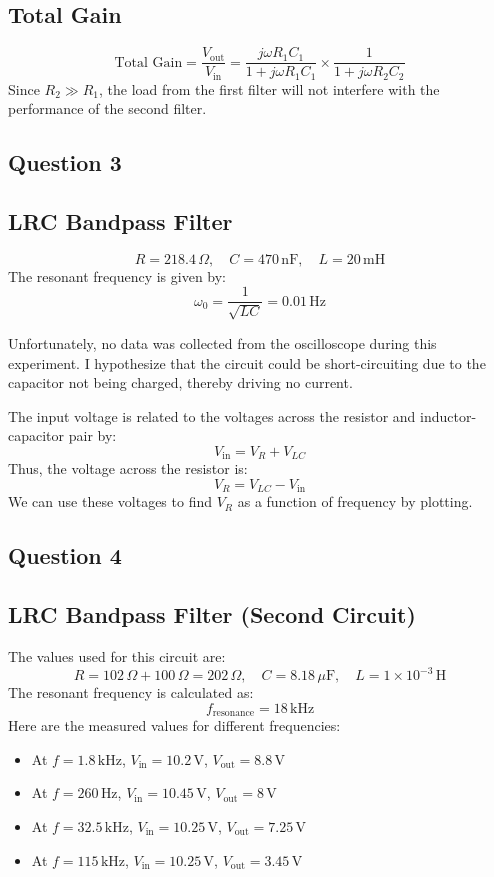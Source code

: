 \documentclass{article}
\begin{document}
\subsection*{Total Gain}
\[
\text{Total Gain} = \frac{V_{\text{out}}}{V_{\text{in}}} = \frac{j \omega R_1 C_1}{1 + j \omega R_1 C_1} \times \frac{1}{1 + j \omega R_2 C_2}
\]
Since \(R_2 \gg R_1\), the load from the first filter will not interfere with the performance of the second filter.

\subsection{ Question 3}

\subsection*{LRC Bandpass Filter}
\[
R = 218.4 \, \Omega, \quad C = 470 \, \text{nF}, \quad L = 20 \, \text{mH}
\]
The resonant frequency is given by:
\[
\omega_0 = \frac{1}{\sqrt{LC}} = 0.01 \, \text{Hz}
\]

Unfortunately, no data was collected from the oscilloscope during this experiment. I hypothesize that the circuit could be short-circuiting due to the capacitor not being charged, thereby driving no current.

The input voltage is related to the voltages across the resistor and inductor-capacitor pair by:
\[
V_{\text{in}} = V_R + V_{LC}
\]
Thus, the voltage across the resistor is:
\[
V_R = V_{LC} - V_{\text{in}}
\]
We can use these voltages to find \(V_R\) as a function of frequency by plotting.

\subsection{ Question 4}

\subsection*{LRC Bandpass Filter (Second Circuit)}
The values used for this circuit are:
\[
R = 102 \, \Omega + 100 \, \Omega = 202 \, \Omega, \quad C = 8.18 \, \mu\text{F}, \quad L = 1 \times 10^{-3} \, \text{H}
\]
The resonant frequency is calculated as:
\[
f_{\text{resonance}} = 18 \, \text{kHz}
\]
Here are the measured values for different frequencies:

\begin{itemize}
    \item At \(f = 1.8 \, \text{kHz}\), \(V_{\text{in}} = 10.2 \, \text{V}\), \(V_{\text{out}} = 8.8 \, \text{V}\)
    \item At \(f = 260 \, \text{Hz}\), \(V_{\text{in}} = 10.45 \, \text{V}\), \(V_{\text{out}} = 8 \, \text{V}\)
    \item At \(f = 32.5 \, \text{kHz}\), \(V_{\text{in}} = 10.25 \, \text{V}\), \(V_{\text{out}} = 7.25 \, \text{V}\)
    \item At \(f = 115 \, \text{kHz}\), \(V_{\text{in}} = 10.25 \, \text{V}\), \(V_{\text{out}} = 3.45 \, \text{V}\)
\end{itemize}
\end{document}
